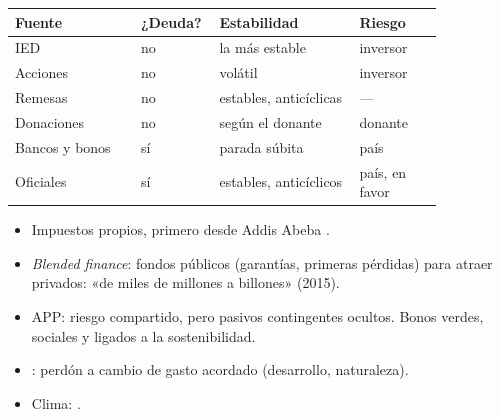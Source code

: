 \documentclass{article}
\begin{document}
\begin{columnas}
{\small\noindent\begin{tabular}{@{}>{\raggedright\arraybackslash}p{0.27\linewidth}|>{\raggedright\arraybackslash}p{0.1\linewidth}|>{\raggedright\arraybackslash}p{0.3\linewidth}|>{\raggedright\arraybackslash}p{0.18\linewidth}@{}}
\textbf{Fuente} & \textbf{¿Deuda?} & \textbf{Estabilidad} & \textbf{Riesgo}\\ \hline
IED & no & la más estable & inversor\\
Acciones & no & volátil & inversor\\
Remesas & no & estables, anticíclicas & —\\
Donaciones & no & según el donante & donante\\
Bancos y bonos & sí & parada súbita & país\\
Oficiales & sí & estables, anticíclicos & país, en favor\\
\end{tabular}\par}
\begin{itemize}
\item Impuestos propios, primero desde Addis Abeba .
\item \emph{Blended finance}: fondos públicos (garantías, primeras pérdidas) para atraer privados: «de miles de millones a billones» (2015).
\item APP: riesgo compartido, pero pasivos contingentes ocultos. Bonos verdes, sociales y ligados a la sostenibilidad.
\item {}: perdón a cambio de gasto acordado (desarrollo, naturaleza).
\item Clima:  .
\end{itemize}


\end{columnas}
\end{document}
